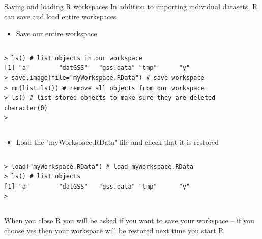 \documentclass[table,smaller]{beamer}
\begin{document}
\begin{frame}[fragile,label=sec-4-5]{Saving and loading R  workspaces}
 In addition to importing individual datasets, R can save and load entire workspaces
\begin{itemize}
\item Save our entire workspace
\end{itemize}
\vspace{-.5em}
\begin{columns}
\begin{block}{}
\begin{verbatim}
> ls() # list objects in our workspace
[1] "a"        "datGSS"   "gss.data" "tmp"      "y"       
> save.image(file="myWorkspace.RData") # save workspace 
> rm(list=ls()) # remove all objects from our workspace 
> ls() # list stored objects to make sure they are deleted
character(0)
>
\end{verbatim}
\end{block}
\end{columns}
\vspace{.5em}

\begin{itemize}
\item Load the "myWorkspace.RData" file and check that it is restored
\end{itemize}

\vspace{-.5em}
\begin{columns}
\begin{block}{}
\begin{verbatim}
> load("myWorkspace.RData") # load myWorkspace.RData
> ls() # list objects
[1] "a"        "datGSS"   "gss.data" "tmp"      "y"       
>
\end{verbatim}
\end{block}
\end{columns}
\vspace{.5em}

When you close R you will be asked if you want to save your workspace -- if you choose yes then your workspace will be restored next time you start R
\end{frame}
\end{document}
